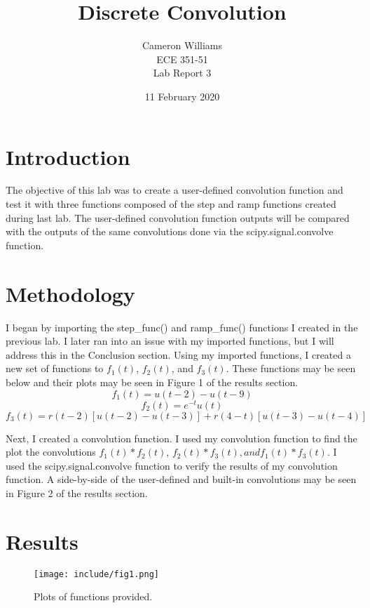 \documentclass[12pt]{article}
\title{Discrete Convolution}
\author{Cameron Williams\\ECE 351-51\\Lab Report 3}
\date{11 February 2020}
\begin{document}
\vspace{\fill}
\maketitle
\vspace{\fill}
\clearpage

\newpage
\section{Introduction}
    \par The objective of this lab was to create a user-defined convolution function and test it with three functions composed of the step and ramp functions created during last lab. The user-defined convolution function outputs will be compared with the outputs of the same convolutions done via the scipy.signal.convolve function.
\newpage

\section{Methodology}
    \par I began by importing the step\_func() and ramp\_func() functions I created in the previous lab. I later ran into an issue with my imported functions, but I will address this in the Conclusion section. Using my imported functions, I created a new set of functions to $f_1(t)$, $f_2(t)$, and $f_3(t)$. These functions may be seen below and their plots may be seen in Figure 1 of the results section.
    $$ f_1(t) = u(t-2) - u(t-9) $$
    $$ f_2(t) = e^{-t}u(t) $$
    $$ f_3(t) = r(t-2)[u(t-2) - u(t-3)] + r(4-t)[u(t-3) - u(t-4)] $$
    \par Next, I created a convolution function. I used my convolution function to find the plot the convolutions $f_1(t) * f_2(t)$, $f_2(t) * f_3(t), and f_1(t) * f_3(t)$. I used the scipy.signal.convolve function to verify the results of my convolution function. A side-by-side of the user-defined and built-in convolutions may be seen in Figure 2 of the results section.

\newpage
\section{Results}
    \begin{figure}[hbt!]
        \centering
        \texttt{[image: include/fig1.png]}
        \caption{Plots of functions provided.}
    \end{figure}
    
\end{document}
